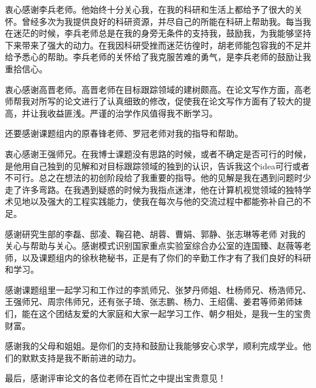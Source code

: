 衷心感谢李兵老师。他始终十分关心我，在我的科研和生活上都给予了很大的关怀。曾经多次为我提供良好的科研资源，并尽自己的所能在科研上帮助我。每当我在迷茫的时候，李兵老师总是在我的身旁无条件的支持我，鼓励我，为我能够坚持下来带来了强大的动力。在我因科研受挫而迷茫彷徨时，胡老师能包容我的不足并给予悉心的帮助。李兵老师的关怀给了我克服苦难的勇气，是李兵老师的鼓励让我重拾信心。

衷心感谢高晋老师。高晋老师在目标跟踪领域的建树颇高。在论文写作方面，高老师帮我对所写的论文进行了认真细致的修改，促使我在论文写作方面有了较大的提高，并让我收益匪浅。严谨的治学作风值得我不断学习。

还要感谢课题组内的原春锋老师、罗冠老师对我的指导和帮助。

衷心感谢王强师兄。在我博士课题没有思路的时候，或者不确定是否可行的时候，是他用自己独到的见解和对目标跟踪领域的独到的认识，告诉我这个idea可行或者不可行。总之在想法的初创阶段给了我重要的指导。他的见解是我在遇到问题时少走了许多弯路。在我遇到疑惑的时候为我指点迷津，他在计算机视觉领域的独特学术见地以及强大的工程实践能力，使我在每次与他的交流过程中都能弥补自己的不足。

感谢研究生部的李磊、邸凌、鞠召艳、胡蓉、曹娟、郭静、张志琳等老师
对我的关心与帮助与关心。感谢模式识别国家重点实验室综合办公室的连国臻、赵薇等老师，以及课题组内的徐秋艳秘书，正是有了你们的辛勤工作才有了我们良好的科研和学习。

感谢课题组里一起学习和工作过的李凯师兄、张梦丹师姐、杜杨师兄、杨浩师兄、王强师兄、周宗伟师兄，还有张子琦、张志鹏、杨力、王绍儒、姜君等师弟师妹们，能在这个团结友爱的大家庭和大家一起学习工作、朝夕相处，是我一生的宝贵财富。

感谢我的父母和姐姐。是你们的支持和鼓励让我能够安心求学，顺利完成学业。他们的默默支持是我不断前进的动力。

最后，感谢评审论文的各位老师在百忙之中提出宝贵意见！
\cleardoublepage[plain]%
